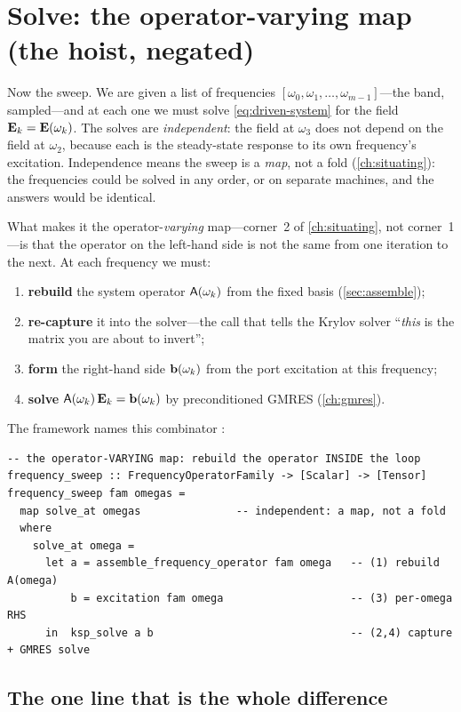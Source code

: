 \section{Solve: the operator-varying map (the hoist, negated)}
\label{sec:solve}

Now the sweep. We are given a list of frequencies
$[\omega_0, \omega_1, \dots, \omega_{m-1}]$---the band, sampled---and at each one
we must solve \cref{eq:driven-system} for the field $\mathbf{E}_k = \mathbf{E}(\omega_k)$. The
solves are \emph{independent}: the field at $\omega_3$ does not depend on the
field at $\omega_2$, because each is the steady-state response to its own
frequency's excitation. Independence means the sweep is a \emph{map}, not a fold
(\cref{ch:situating}): the frequencies could be solved in any order, or on
separate machines, and the answers would be identical.

What makes it the operator-\emph{varying} map---corner~2 of \cref{ch:situating},
not corner~1---is that the operator on the left-hand side is not the same from one
iteration to the next. At each frequency we must:
\begin{enumerate}[nosep]
  \item \textbf{rebuild} the system operator $\mathsf{A}(\omega_k)$ from the fixed
  basis (\cref{sec:assemble});
  \item \textbf{re-capture} it into the solver---the call that tells the Krylov
  solver ``\emph{this} is the matrix you are about to invert'';
  \item \textbf{form} the right-hand side $\mathbf{b}(\omega_k)$ from the port
  excitation at this frequency;
  \item \textbf{solve} $\mathsf{A}(\omega_k)\,\mathbf{E}_k = \mathbf{b}(\omega_k)$ by preconditioned
  GMRES (\cref{ch:gmres}).
\end{enumerate}
The framework names this combinator :
\begin{lstlisting}[style=l4style]
-- the operator-VARYING map: rebuild the operator INSIDE the loop
frequency_sweep :: FrequencyOperatorFamily -> [Scalar] -> [Tensor]
frequency_sweep fam omegas =
  map solve_at omegas               -- independent: a map, not a fold
  where
    solve_at omega =
      let a = assemble_frequency_operator fam omega   -- (1) rebuild A(omega)
          b = excitation fam omega                    -- (3) per-omega RHS
      in  ksp_solve a b                               -- (2,4) capture + GMRES solve
\end{lstlisting}

\subsection{The one line that is the whole difference}

